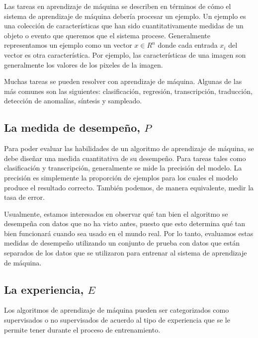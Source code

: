 \vspace{1em}

Las tareas en aprendizaje de máquina se describen en términos de cómo el sistema de aprendizaje de máquina debería procesar un ejemplo. Un ejemplo es una colección de características que han sido cuantitativamente medidas de un objeto o evento que queremos que el sistema procese. Generalmente representamos un ejemplo como un vector $x \in R^n$ donde cada entrada $x_i$ del vector es otra característica. Por ejemplo, las características de una imagen son generalmente los valores de los pixeles de la imagen. \cite{goodfellow-et-al-2016}

\vspace{1em}

Muchas tareas se pueden resolver con aprendizaje de máquina. Algunas de las más comunes son las siguientes: clasificación, regresión, transcripción, traducción, detección de anomalías, síntesis y sampleado.

\subsection{La medida de desempeño, $P$}
Para poder evaluar las habilidades de un algoritmo de aprendizaje de máquina, se debe diseñar una medida cuantitativa de su desempeño. Para tareas tales como clasificación y transcripción, generalmente se mide la precisión del modelo. La precisión es simplemente la proporción de ejemplos para los cuales el modelo produce el resultado correcto. También podemos, de manera equivalente, medir la tasa de error. 

\vspace{1em}

Usualmente, estamos interesados en observar qué tan bien el algoritmo se desempeña con datos que no ha visto antes, puesto que esto determina qué tan bien funcionará cuando sea usado en el mundo real. Por lo tanto, evaluamos estas medidas de desempeño utilizando un conjunto de prueba con datos que están separados de los datos que se utilizaron para entrenar al sistema de aprendizaje de máquina. \cite{goodfellow-et-al-2016}

\subsection{La experiencia, $E$}
Los algoritmos de aprendizaje de máquina pueden ser categorizados como supervisados o no supervisados de acuerdo al tipo de experiencia que se le permite tener durante el proceso de entrenamiento.

